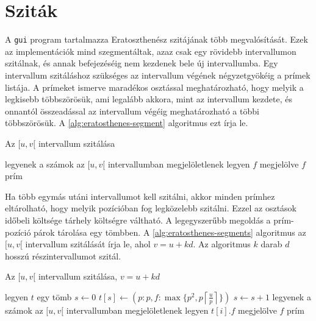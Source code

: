 \section{Sziták}
\label{sec:szitak}

A \texttt{gui} program tartalmazza Eratoszthenész szitájának több megvalósítását.
Ezek az implementációk mind szegmentáltak, azaz csak egy rövidebb intervallumon szitálnak,
és annak befejezéséig nem kezdenek bele új intervallumba.
Egy intervallum szitáláshoz szükséges az intervallum végének négyzetgyökéig a prímek listája.
A prímeket ismerve maradékos osztással meghatározható, hogy melyik a legkisebb többszörösük, ami legalább akkora, mint az intervallum kezdete, és onnantól összeadással az intervallum végéig meghatározható a többi többszörösük.
A \ref{alg:eratosthenes-segment} algoritmus ezt írja le.

\begin{algorithm}
\caption{Az $[u, v[$ intervallum szitálása}
\label{alg:eratosthenes-segment}
\begin{algorithmic}[1]
\State legyenek a számok az $[u, v[$ intervallumban megjelöletlenek
		\State legyen $f$ megjelölve
	\EndFor
\EndFor
\For{$f \in [u, v[$}
		\State $f$ prím
	\EndIf
\EndFor
\end{algorithmic}
\end{algorithm}

Ha több egymás utáni intervallumot kell szitálni, akkor minden prímhez eltárolható, hogy melyik pozícióban fog legközelebb szitálni.
Ezzel az osztások időbeli költsége tárhely költségre váltható.
A legegyszerűbb megoldás a prím-pozíció párok tárolása egy tömbben.
A \ref{alg:eratosthenes-segments} algoritmus az $[u, v[$ intervallum szitálását írja le, ahol $v=u+kd$. Az algoritmus $k$ darab $d$ hosszú részintervallumot szitál.

\begin{algorithm}
\caption{Az $[u, v[$ intervallum szitálása, $v=u+kd$}
\label{alg:eratosthenes-segments}
\begin{algorithmic}[1]
\State legyen $t$ egy tömb
\State $s \gets 0$ 
	\State $t[s] \gets (p: p, f: \max \lbrace p^2, p \left \lceil{\frac{u}{p}}\right \rceil \rbrace )$
	\State $s \gets s+1$
\EndFor
{}
	\State legyenek a számok az $[u, v[$ intervallumban megjelöletlenek
			\State legyen $t[i].f$ megjelölve
		\EndFor
	\EndFor
	\For{$f \in [u, v[$}
			\State $f$ prím
		\EndIf
	\EndFor
\EndFor
\end{algorithmic}
\end{algorithm}

